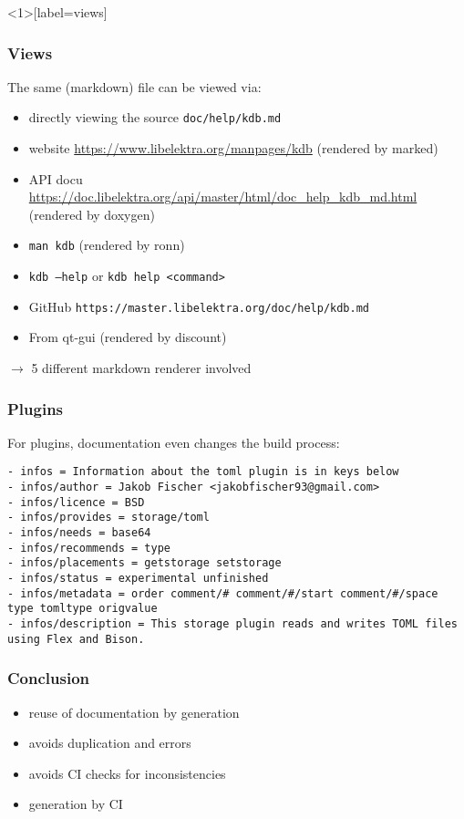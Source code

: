 \begin{frame}<1>[label=views]
	\frametitle{Views}

	The same (markdown) file can be viewed via:
	
	\begin{itemize}[<+-| alert@+>]
	\item directly viewing the source \texttt{doc/help/kdb.md}
	\item website \url{https://www.libelektra.org/manpages/kdb} (rendered by marked)
	\item API docu \url{https://doc.libelektra.org/api/master/html/doc_help_kdb_md.html} (rendered by doxygen)
	\item \texttt{man kdb} (rendered by ronn)
	\item \texttt{kdb --help} or \texttt{kdb help <command>}
	\item GitHub \texttt{https://master.libelektra.org/doc/help/kdb.md}
	\item From qt-gui (rendered by discount)
	\end{itemize}

	\pause[\thebeamerpauses]  %

	$\rightarrow$ 5 different markdown renderer involved
\end{frame}

\begin{frame}[fragile]
	\frametitle{Plugins}

	For plugins, documentation even changes the build process:
	\begin{lstlisting}[keywords={infos,author,license,provides,needs,recommends,placements,status,metadata}]
- infos = Information about the toml plugin is in keys below
- infos/author = Jakob Fischer <jakobfischer93@gmail.com>
- infos/licence = BSD
- infos/provides = storage/toml
- infos/needs = base64
- infos/recommends = type
- infos/placements = getstorage setstorage
- infos/status = experimental unfinished
- infos/metadata = order comment/# comment/#/start comment/#/space type tomltype origvalue
- infos/description = This storage plugin reads and writes TOML files using Flex and Bison.\end{lstlisting}
\end{frame}

\begin{frame}
	\frametitle{Conclusion}

	\begin{itemize}[<+-| alert@+>]
	\item reuse of documentation by generation
	\item avoids duplication and errors
	\item avoids CI checks for inconsistencies
	\item generation by CI
	\end{itemize}
\end{frame}

